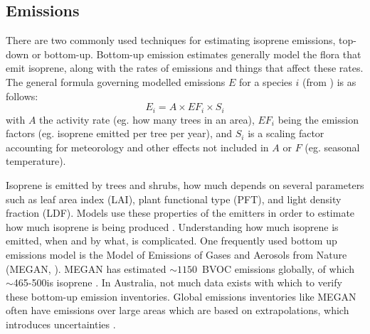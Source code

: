   
  \subsection{Emissions}
  
    There are two commonly used techniques for estimating isoprene emissions, top-down or bottom-up.
    Bottom-up emission estimates generally model the flora that emit isoprene, along with the rates of emissions and things that affect these rates.
    The general formula governing modelled emissions $E$ for a species $i$ (from \textcite{BrasseurJacob2017}) is as follows:
    \begin{equation*}
      E_i = A \times EF_i \times S_i
    \end{equation*}
    with $A$ the activity rate (eg. how many trees in an area), $EF_i$ being the emission factors (eg. isoprene emitted per tree per year), and $S_i$ is a scaling factor accounting for meteorology and other effects not included in $A$ or $F$ (eg. seasonal temperature).
    
    Isoprene is emitted by trees and shrubs, how much depends on several parameters such as leaf area index (LAI), plant functional type (PFT), and light density fraction (LDF).
    Models use these properties of the emitters in order to estimate how much isoprene is being produced \parencite[eg.][]{Guenther1995,Guenther2006}.
    Understanding how much isoprene is emitted, when and by what, is complicated.
    One frequently used bottom up emissions model is the Model of Emissions of Gases and Aerosols from Nature (MEGAN, \textcite{Guenther1995}).
    MEGAN has estimated $\sim 1150$\tgcpyr ~BVOC emissions globally, of which $\sim$465-500\tgcpyr is isoprene \parencite{Guenther2006, Messina2016}. 
    In Australia, not much data exists with which to verify these bottom-up emission inventories.
    Global emissions inventories like MEGAN often have emissions over large areas which are based on extrapolations, which introduces uncertainties \parencite{Miller2014}.
    
    
